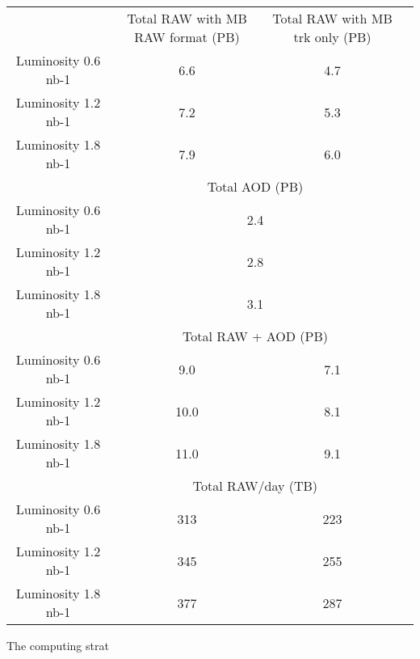  
\begin{center}
\begin{tabular}{ |c|c|c|c|} \label{tab:datavolume}


\hline
&  Total RAW with MB RAW format (PB) &  Total RAW with MB trk only (PB)\\
Luminosity 0.6 nb-1 & 6.6 & 4.7 \\
Luminosity 1.2 nb-1 & 7.2 & 5.3 \\ 
Luminosity 1.8 nb-1 & 7.9 & 6.0 \\                 
\hline
& \multicolumn{2}{c|}{Total AOD (PB)}\\
Luminosity 0.6 nb-1 & \multicolumn{2}{c|}{2.4} \\
Luminosity 1.2 nb-1 & \multicolumn{2}{c|}{2.8} \\ 
Luminosity 1.8 nb-1 & \multicolumn{2}{c|}{3.1} \\
\hline
&  \multicolumn{2}{c|}{Total RAW + AOD (PB)}\\
Luminosity 0.6 nb-1 & 9.0 & 7.1 \\
Luminosity 1.2 nb-1 & 10.0 & 8.1 \\ 
Luminosity 1.8 nb-1 & 11.0 & 9.1 \\   
\hline 
&  \multicolumn{2}{c|}{Total RAW/day (TB)}\\
Luminosity 0.6 nb-1 & 313 & 223 \\
Luminosity 1.2 nb-1 & 345 & 255 \\ 
Luminosity 1.8 nb-1 & 377 & 287 \\   
\hline 
\end{tabular}
\end{center}


The computing strat